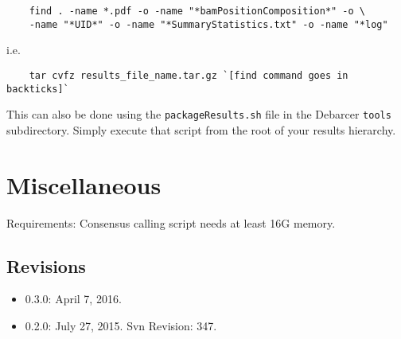 \documentclass{article}
\begin{document}
\begin{verbatim}
	find . -name *.pdf -o -name "*bamPositionComposition*" -o \
	-name "*UID*" -o -name "*SummaryStatistics.txt" -o -name "*log"
\end{verbatim}

i.e.

\begin{verbatim}
	tar cvfz results_file_name.tar.gz `[find command goes in backticks]`
\end{verbatim}

This can also be done using the \texttt{packageResults.sh} file
in the Debarcer \texttt{tools} subdirectory. Simply execute that
script from the root of your results hierarchy.

\section{Miscellaneous}

Requirements:  Consensus calling script needs at least 16G memory.

\subsection{Revisions}

\begin{itemize}
  \item 0.3.0:  April 7, 2016. 
  \item 0.2.0:  July 27, 2015.  Svn Revision: 347.  
\end{itemize}
\end{document}
